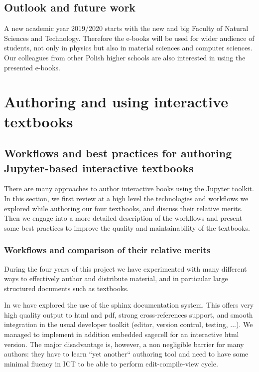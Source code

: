 \documentclass{deliverablereport}
\begin{document}
{{{\subsection{Outlook and future work}

A new academic year 2019/2020 starts with the new and big Faculty of
Natural Sciences and Technology. Therefore the e-books will be used
for wider audience of students, not only in physics but also in
material sciences and computer sciences. Our colleagues from other
Polish higher schools are also interested in using the presented
e-books.


\section{Authoring and using interactive textbooks}\label{sec:auth-using-inter}

\subsection{Workflows and best practices for authoring Jupyter-based
  interactive textbooks}\label{sec:good-pract-softw}

There are many approaches to author interactive books using the
Jupyter toolkit. In this section, we first review at a high level the
technologies and workflows we explored while authoring our four
textbooks, and discuss their relative merits. Then we engage into a
more detailed description of the workflows and present some best
practices to improve the quality and maintainability of the textbooks.

\subsubsection{Workflows and comparison of their relative merits}

During the four years of this project we have experimented with many
different ways to effectively author and distribute material, and in
particular large structured documents such as textbooks.

In  we have explored the use of the
sphinx documentation system. This offers very high quality output to
html and pdf, strong cross-references support, and smooth integration
in the usual developer toolkit (editor, version control, testing,
...). We managed to implement in addition embedded sagecell for an
interactive html version. The major disadvantage is, however, a non
negligible barrier for many authors: they have to learn ``yet
another`` authoring tool and need to have some minimal fluency in ICT
to be able to perform edit-compile-view cycle.

}}}
\end{document}
